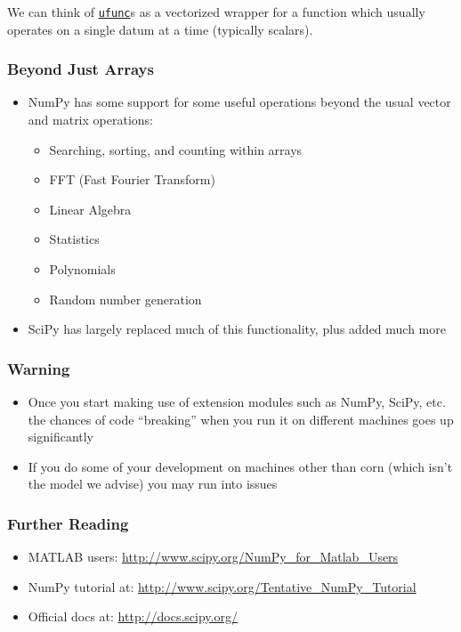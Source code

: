 \documentclass[12pt,letterpaper,twoside]{article}
\begin{document}
We can think of \href{https://docs.scipy.org/doc/numpy-1.15.1/reference/ufuncs.html#universal-functions-ufunc}{\texttt{ufunc}}s as a vectorized wrapper for a function
which usually operates on a single datum at a time (typically scalars).

\subsubsection{Beyond Just Arrays}
\begin{itemize}
\item
  NumPy has some support for some useful operations beyond the usual
  vector and matrix operations:

  \begin{itemize}
  \item
    Searching, sorting, and counting within arrays
  \item
    FFT (Fast Fourier Transform)
  \item
    Linear Algebra
  \item
    Statistics
  \item
    Polynomials
  \item
    Random number generation
  \end{itemize}
\item
  SciPy has largely replaced much of this functionality, plus added much
  more
\end{itemize}

\subsubsection{Warning}
\begin{itemize}
\item
  Once you start making use of extension modules such as NumPy, SciPy,
  etc. the chances of code ``breaking'' when you run it on different
  machines goes up significantly
\item
  If you do some of your development on machines other than corn (which
  isn't the model we advise) you may run into issues
\end{itemize}

\subsubsection{Further Reading}
\begin{itemize}
\item
  MATLAB users: \url{http://www.scipy.org/NumPy_for_Matlab_Users}
\item
  NumPy tutorial at: \url{http://www.scipy.org/Tentative_NumPy_Tutorial}
\item
  Official docs at: \url{http://docs.scipy.org/}
\end{itemize}
\end{document}
